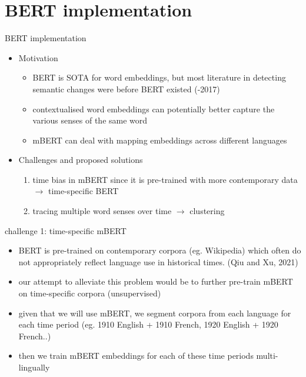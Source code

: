 \documentclass[10pt]{beamer}
\begin{document}
\section{BERT implementation}
\begin{frame}{BERT implementation}
\begin{itemize}
    \item Motivation
    \begin{itemize}
        
        \item BERT is SOTA for word embeddings, but most literature in detecting semantic changes were before BERT existed (-2017)
        
        \item contextualised word embeddings can potentially better capture the various senses of the same word
        
        \item mBERT can deal with mapping embeddings across different languages
        
    \end{itemize}
    \item Challenges and proposed solutions 
    \begin{enumerate}
        \item time bias in mBERT since it is pre-trained with more contemporary data $\rightarrow$ time-specific BERT
        \item tracing multiple word senses over time $\rightarrow$ clustering
    \end{enumerate}
\end{itemize}
\end{frame}

\begin{frame}{challenge 1: time-specific mBERT}
    \begin{itemize}
        \item BERT is pre-trained on contemporary corpora (eg. Wikipedia) which often do not appropriately reflect language use in historical times. (Qiu and Xu, 2021)
        \item our attempt to alleviate this problem would be to further pre-train mBERT on time-specific corpora (unsupervised)
        \item given that we will use mBERT, we segment corpora from each language for each time period (eg. 1910 English + 1910 French, 1920 English + 1920 French..)
        \item then we train mBERT embeddings for each of these time periods multi-lingually
    \end{itemize}
\end{frame}
\end{document}
